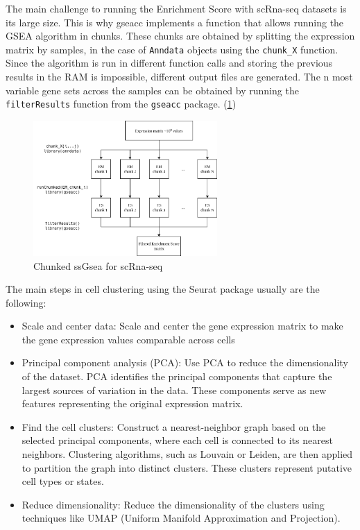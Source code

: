 \documentclass[aps,prb,twocolumn,superscriptaddress,floatfix,longbibliography]{revtex4-2}
\newif\ifptitle
\newif\ifpnumber
\newcounter{para}
\newcommand\ptitle[1]{\par\refstepcounter{para}
{\ifpnumber{\noindent\textcolor{lightgray}{\textbf{\thepara}}\indent}\fi}
{\ifptitle{\textbf{[{#1}]}}\fi}}
\begin{document}
\ptitle{gseacc} The main challenge to running the Enrichment Score with scRna-seq datasets is its large size. This is why gseacc implements a function that allows running the GSEA algorithm in chunks. These chunks are obtained by splitting the expression matrix by samples, in the case of \texttt{Anndata} objects using the \texttt{chunk\_X} function. Since the algorithm is run in different function calls and storing the previous results in the RAM is impossible, different output files are generated. The n most variable gene sets across the samples can be obtained by running the \texttt{filterResults} function from the \texttt{gseacc} package. (\ref{fig:chunkedgsea})


\begin{figure}[h]
\centering
\includegraphics[clip=true,width=7cm]{img/gsea-pipeline.png}
\caption{Chunked ssGsea for scRna-seq}
\label{fig:chunkedgsea}
\end{figure}


\ptitle{Seurat \cite{seurat-v4} \cite{seurat-web}} The main steps in cell clustering using the Seurat package usually are the following:
\begin{itemize}
\item Scale and center data: Scale and center the gene expression matrix to make the gene expression values comparable across cells
\item Principal component analysis (PCA): Use PCA to reduce the dimensionality of the dataset. PCA identifies the principal components that capture the largest sources of variation in the data. These components serve as new features representing the original expression matrix.
\item Find the cell clusters: Construct a nearest-neighbor graph based on the selected principal components, where each cell is connected to its nearest neighbors. Clustering algorithms, such as Louvain or Leiden, are then applied to partition the graph into distinct clusters. These clusters represent putative cell types or states.
\item Reduce dimensionality: Reduce the dimensionality of the clusters using techniques like UMAP (Uniform Manifold Approximation and Projection).
\end{itemize}
\end{document}

